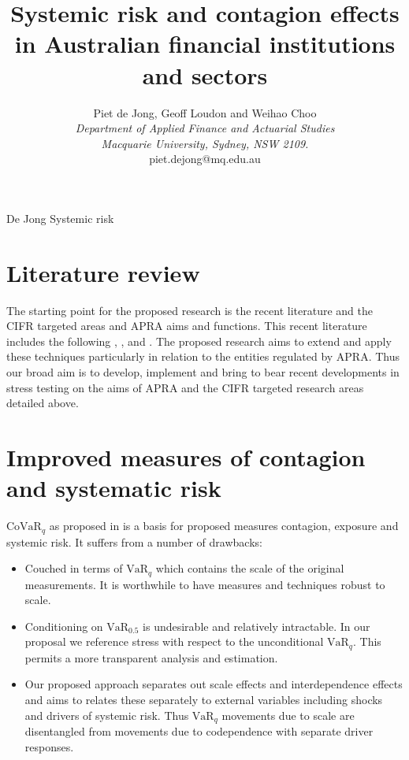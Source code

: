\documentclass[authoryear]{elsarticle}
\newcommand{\bi}{\begin{itemize}}
\newcommand{\ei}{\end{itemize}}
\renewcommand{\i}{\item}
\newcommand{\var}{\ensuremath{\mathrm{VaR}}}
\newcommand{\covar}{\ensuremath{\mathrm{CoVaR}}}
\renewcommand{\v}{\ensuremath{\mathrm{v}_q}}
\begin{document}
\title{Systemic risk and contagion effects in Australian financial institutions and sectors}
\author{Piet de Jong,  Geoff Loudon and Weihao Choo \\[4pt]
\textit{Department of Applied Finance and Actuarial Studies\\ Macquarie University, Sydney, NSW 2109.}
\\[2pt]
{piet.dejong@mq.edu.au}}

\markboth%
{De Jong}
{Systemic risk}

\maketitle

\section{Literature review}

The starting point for the proposed research is the recent literature and the CIFR targeted areas and APRA aims and functions.
This recent literature includes the following
\cite{adrian2011covar},
\cite{acharya2012capital},
\cite{acharya2012measuring}
and \cite{brownlees2010volatility}.   The proposed research aims to extend and apply these techniques particularly in relation to the entities regulated by APRA.   Thus our  broad aim is to develop, implement and bring to bear recent developments in stress testing  on the aims of APRA and the CIFR targeted research areas detailed above.   

\section{Improved  measures of contagion and systematic risk}
\renewcommand{\c}{\ensuremath{\mathrm{CoVaR_q}}}
\renewcommand{\v}{\ensuremath{\mathrm{VaR}_q}}

$\covar_q$ as proposed in \cite{adrian2011covar} is a basis for proposed measures contagion, exposure and systemic risk.   It  suffers from a number of drawbacks:
\bi
\i Couched in terms of $\var_q$ which contains the scale of the original measurements.   It is worthwhile to have measures and techniques robust to scale.
\i  Conditioning  on $\var_{0.5}$ is undesirable and relatively intractable.  In our proposal we reference stress with respect  to the unconditional $\var_q$.   This permits a more transparent analysis and estimation. 
\i  Our proposed approach  separates out scale effects and interdependence effects and aims to  relates these separately to external variables including shocks and drivers of systemic risk.   Thus $\var_q$ movements due to scale are disentangled from movements due to codependence with separate driver responses.
\ei
\end{document}
